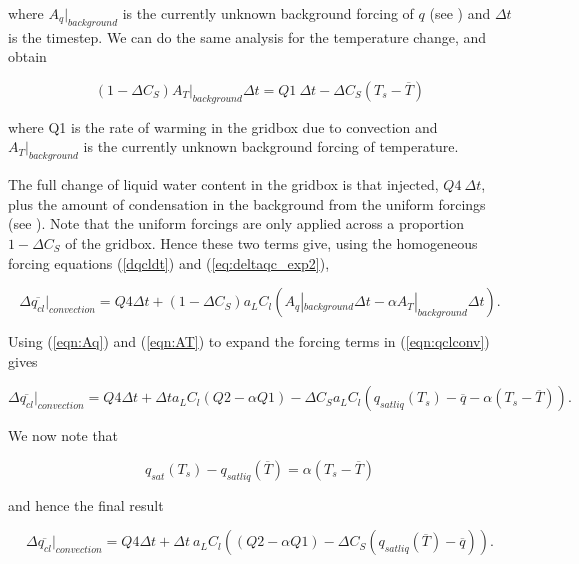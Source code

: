 \documentclass{UMDP_article}
\begin{document}
where $A_q |_{background}$ is the currently unknown background forcing of
$q$ (see \cite{gwb02}) and $\Delta t$ is the timestep. 
We can do the same analysis for the temperature change, and obtain

\begin{equation}
(1 - \Delta C_S) A_T |_{background} \Delta t  =  Q1~ \Delta t -
\Delta C_S (T_s - \overline{T} )
\label{eqn:AT}
\end{equation}

where Q1 is the rate of warming in the gridbox due to convection and $A_T |_{background}$ is
the currently unknown background forcing of temperature.

The full change of liquid water content in the gridbox is that injected,
$Q4~\Delta t$, plus the amount of condensation in the background from
the uniform forcings (see
\cite{wg03}). Note that the uniform forcings are only applied across
a proportion $1 - \Delta C_S$ of the gridbox. Hence these two terms give, using the
homogeneous forcing equations (\ref{dqcldt}) and (\ref{eq:deltaqc_exp2}),

\begin{equation}
\Delta \overline{q_{cl}} |_{convection} = Q4 \Delta t
+ (1 - \Delta C_S) a_L C_l (A_q |_{background} \Delta t
- \alpha A_T |_{background} \Delta t ).  
\label{eqn:qclconv}
\end{equation}

Using (\ref{eqn:Aq}) and (\ref{eqn:AT}) to expand the forcing terms in (\ref{eqn:qclconv}) gives

\begin{equation}
\Delta \overline{q_{cl}} |_{convection} = Q4 \Delta t
+ \Delta t a_L C_l ( Q2 - \alpha Q1) - \Delta C_S a_L C_l 
(q_{sat liq}(T_s)-\overline{q} - \alpha (T_s - \overline{T})) .
\end{equation}

We now note that

\begin{equation}
q_{sat} (T_s) - q_{sat liq} (\overline{T}) = \alpha (T_s - \overline{T} )
\end{equation}

and hence the final result

\begin{equation}
\Delta \overline{q_{cl}} |_{convection} = Q4 \Delta t
+ \Delta t ~ a_L C_l (  ( Q2 - \alpha Q1) - \Delta C_S 
(q_{sat liq}(\overline{T}) - \overline{q} ) ) .
\label{eqn:dqcl}
\end{equation}
\end{document}
